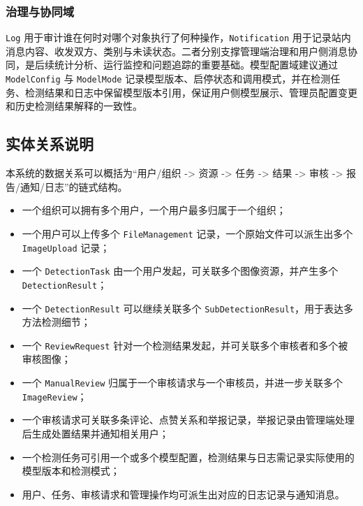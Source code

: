 \subsubsection{治理与协同域}
\texttt{Log} 用于审计谁在何时对哪个对象执行了何种操作，\texttt{Notification} 用于记录站内消息内容、收发双方、类别与未读状态。二者分别支撑管理端治理和用户侧消息协同，是后续统计分析、运行监控和问题追踪的重要基础。模型配置域建议通过 \texttt{ModelConfig} 与 \texttt{ModelMode} 记录模型版本、启停状态和调用模式，并在检测任务、检测结果和日志中保留模型版本引用，保证用户侧模型展示、管理员配置变更和历史检测结果解释的一致性。

\subsection{实体关系说明}
本系统的数据关系可以概括为“用户/组织 -> 资源 -> 任务 -> 结果 -> 审核 -> 报告/通知/日志”的链式结构。

\begin{itemize}[leftmargin=2em]
    \item 一个组织可以拥有多个用户，一个用户最多归属于一个组织；
    \item 一个用户可以上传多个 \texttt{FileManagement} 记录，一个原始文件可以派生出多个 \texttt{ImageUpload} 记录；
    \item 一个 \texttt{DetectionTask} 由一个用户发起，可关联多个图像资源，并产生多个 \texttt{DetectionResult}；
    \item 一个 \texttt{DetectionResult} 可以继续关联多个 \texttt{SubDetectionResult}，用于表达多方法检测细节；
    \item 一个 \texttt{ReviewRequest} 针对一个检测结果发起，并可关联多个审核者和多个被审核图像；
    \item 一个 \texttt{ManualReview} 归属于一个审核请求与一个审核员，并进一步关联多个 \texttt{ImageReview}；
    \item 一个审核请求可关联多条评论、点赞关系和举报记录，举报记录由管理端处理后生成处置结果并通知相关用户；
    \item 一个检测任务可引用一个或多个模型配置，检测结果与日志需记录实际使用的模型版本和检测模式；
    \item 用户、任务、审核请求和管理操作均可派生出对应的日志记录与通知消息。
\end{itemize}

